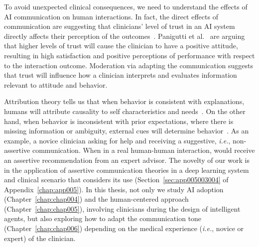 To avoid unexpected clinical consequences, we need to understand the effects of \ac{AI} communication on human interactions.
In fact, the direct effects of communication are suggesting that clinicians' level of trust in an \ac{AI} system directly affects their perception of the outcomes~\cite{HOHENSTEIN2020106190}.
Panigutti et al.~\cite{10.1145/3491102.3502104} are arguing that higher levels of trust will cause the clinician to have a positive attitude, resulting in high satisfaction and positive perceptions of performance with respect to the interaction outcome.
Moderation via adapting the communication suggests that trust will influence how a clinician interprets and evaluates information relevant to attitude and behavior.

Attribution theory tells us that when behavior is consistent with explanations, humans will attribute causality to self characteristics and needs~\cite{CALISTO2021102607}.
On the other hand, when behavior is inconsistent with prior expectations, where there is missing information or ambiguity, external cues will determine behavior~\cite{HOHENSTEIN2020106190}.
As an example, a novice clinician asking for help and receiving a suggestive, {\it i.e.}, non-assertive communication.
When in a real human-human interaction, would receive an assertive recommendation from an expert advisor.
The novelty of our work is in the application of assertive communication theories in a deep learning system and clinical scenario that considers its use (Section~\ref{sec:app005003004} of Appendix~\ref{chap:app005}).
In this thesis, not only we study \ac{AI} adoption (Chapter~\ref{chap:chap004}) and the human-centered approach (Chapter~\ref{chap:chap005}), involving clinicians during the design of intelligent agents, but also exploring how to adapt the communication tone (Chapter~\ref{chap:chap006}) depending on the medical experience ({\it i.e.}, novice or expert) of the clinician.